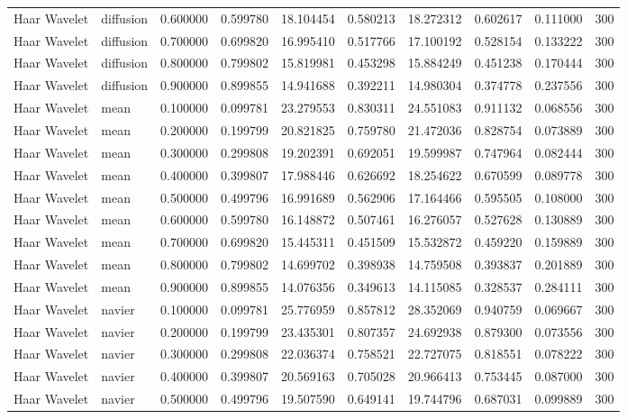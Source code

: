\begin{table}[h]
\begin{tabular}{llrrrrrrrr}
Haar Wavelet & diffusion & 0.600000 & 0.599780 & 18.104454 & 0.580213 & 18.272312 & 0.602617 & 0.111000 & 300 \\
Haar Wavelet & diffusion & 0.700000 & 0.699820 & 16.995410 & 0.517766 & 17.100192 & 0.528154 & 0.133222 & 300 \\
Haar Wavelet & diffusion & 0.800000 & 0.799802 & 15.819981 & 0.453298 & 15.884249 & 0.451238 & 0.170444 & 300 \\
Haar Wavelet & diffusion & 0.900000 & 0.899855 & 14.941688 & 0.392211 & 14.980304 & 0.374778 & 0.237556 & 300 \\
Haar Wavelet & mean & 0.100000 & 0.099781 & 23.279553 & 0.830311 & 24.551083 & 0.911132 & 0.068556 & 300 \\
Haar Wavelet & mean & 0.200000 & 0.199799 & 20.821825 & 0.759780 & 21.472036 & 0.828754 & 0.073889 & 300 \\
Haar Wavelet & mean & 0.300000 & 0.299808 & 19.202391 & 0.692051 & 19.599987 & 0.747964 & 0.082444 & 300 \\
Haar Wavelet & mean & 0.400000 & 0.399807 & 17.988446 & 0.626692 & 18.254622 & 0.670599 & 0.089778 & 300 \\
Haar Wavelet & mean & 0.500000 & 0.499796 & 16.991689 & 0.562906 & 17.164466 & 0.595505 & 0.108000 & 300 \\
Haar Wavelet & mean & 0.600000 & 0.599780 & 16.148872 & 0.507461 & 16.276057 & 0.527628 & 0.130889 & 300 \\
Haar Wavelet & mean & 0.700000 & 0.699820 & 15.445311 & 0.451509 & 15.532872 & 0.459220 & 0.159889 & 300 \\
Haar Wavelet & mean & 0.800000 & 0.799802 & 14.699702 & 0.398938 & 14.759508 & 0.393837 & 0.201889 & 300 \\
Haar Wavelet & mean & 0.900000 & 0.899855 & 14.076356 & 0.349613 & 14.115085 & 0.328537 & 0.284111 & 300 \\
Haar Wavelet & navier & 0.100000 & 0.099781 & 25.776959 & 0.857812 & 28.352069 & 0.940759 & 0.069667 & 300 \\
Haar Wavelet & navier & 0.200000 & 0.199799 & 23.435301 & 0.807357 & 24.692938 & 0.879300 & 0.073556 & 300 \\
Haar Wavelet & navier & 0.300000 & 0.299808 & 22.036374 & 0.758521 & 22.727075 & 0.818551 & 0.078222 & 300 \\
Haar Wavelet & navier & 0.400000 & 0.399807 & 20.569163 & 0.705028 & 20.966413 & 0.753445 & 0.087000 & 300 \\
Haar Wavelet & navier & 0.500000 & 0.499796 & 19.507590 & 0.649141 & 19.744796 & 0.687031 & 0.099889 & 300 \\

\end{tabular}
\end{table}

